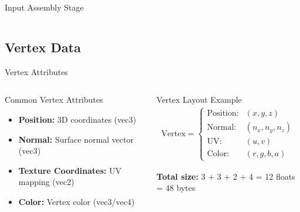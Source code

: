 \begin{frame}{Input Assembly Stage}
\begin{columns}
\begin{column}{0.5\textwidth}
    \end{column}
  \end{columns}
\end{frame}

\subsection{Vertex Data}
\begin{frame}{Vertex Attributes}
  \begin{columns}
    \begin{column}{0.5\textwidth}
      \begin{conceptbox}{Common Vertex Attributes}
        \begin{itemize}
          \item \textbf{Position:} 3D coordinates (vec3)
          \item \textbf{Normal:} Surface normal vector (vec3)
          \item \textbf{Texture Coordinates:} UV mapping (vec2)
          \item \textbf{Color:} Vertex color (vec3/vec4)
        \end{itemize}
      \end{conceptbox}
    \end{column}
    \begin{column}{0.5\textwidth}
      \begin{mathbox}{Vertex Layout Example}
        \small
        \begin{align}
          \text{Vertex} =
          \begin{cases}
            \text{Position:} & (x, y, z) \\
            \text{Normal:} & (n_x, n_y, n_z) \\
            \text{UV:} & (u, v) \\
            \text{Color:} & (r, g, b, a)
          \end{cases}
        \end{align}

        \vspace{0.2cm}
        \textbf{Total size:} 3 + 3 + 2 + 4 = 12 floats = 48 bytes
      \end{mathbox}
    \end{column}
  \end{columns}


\end{frame}
